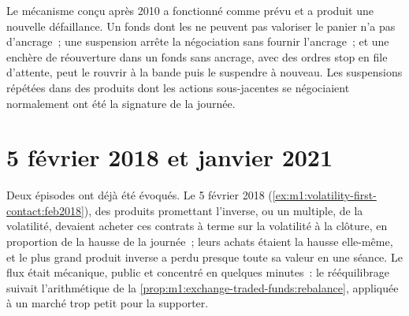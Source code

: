 Le mécanisme conçu après 2010 a fonctionné comme prévu et a produit une nouvelle
défaillance. Un fonds dont les  ne peuvent pas valoriser le panier n'a
pas d'ancrage~; une suspension arrête la négociation sans fournir l'ancrage~; et une
enchère de réouverture dans un fonds sans ancrage, avec des ordres stop en file
d'attente, peut le rouvrir à la bande puis le suspendre à nouveau. Les suspensions répétées dans des produits dont les actions sous-jacentes
se négociaient normalement ont été la signature de la journée.

\begin{omfigure}

\label{fig:m1:stress-case-studies:halts}
\end{omfigure}

\section{5 février 2018 et janvier 2021}

Deux épisodes ont déjà été évoqués. Le 5 février 2018
(\cref{ex:m1:volatility-first-contact:feb2018}), des produits promettant
l'inverse, ou un multiple, de la volatilité, devaient acheter ces contrats à terme
sur la volatilité à la clôture, en proportion de la hausse de la journée~; leurs achats étaient la hausse elle-même, et le
plus grand produit inverse a perdu presque toute sa valeur en une séance. Le flux
était mécanique, public et concentré en quelques minutes~: le rééquilibrage
suivait l'arithmétique de la \cref{prop:m1:exchange-traded-funds:rebalance}, appliquée à
un marché trop petit pour la supporter.

